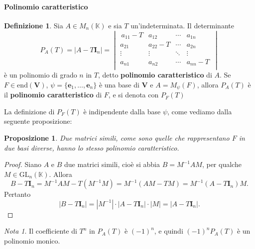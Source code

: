 \documentclass{article}
\theoremstyle{plain}
\newtheorem{prop}[thm]{Proposizione}
\theoremstyle{definition}
\newtheorem{defn}{Definizione}[section]
\theoremstyle{remark}
\newtheorem{note}{Nota}
\begin{document}
\paragraph{Polinomio caratteristico}
\begin{bxthm}
\begin{defn}
Sia $A \in M_n(\mathbb{K})$ e sia $T$ un'indeterminata. Il determinante
\[
P_A(T) = \lvert A - T \mathbf{I}_n \rvert =
\begin{vmatrix}
\,a_{11} - T & a_{12} & \cdots & a_{1n} \\
a_{21} & a_{22} - T & \cdots & a_{2n} \\
\vdots & \vdots & \ddots & \vdots \\
a_{n1} & a_{n2} & \cdots & a_{nn} - T \,\\
\end{vmatrix}
\]
è un polinomio di grado $n$ in $T$, detto \textbf{polinomio caratteristico} di $A$.    
Se $F\in\mathrm{end}(\mathbf{V})$, $\psi=\{\mathbf{e}_1,\ldots,\mathbf{e}_n\}$ è una base di $\mathbf{V}$ 
e $A=M_\psi(F)$, allora $P_A(T)$ è il \textbf{polinomio caratteristico} di $F$, e si denota con $P_F(T)$
\end{defn}
\end{bxthm}

\vspace{10pt}

La definizione di $P_F(T)$ è indipendente dalla base $\psi$, come vediamo dalla seguente proposizione:

\vspace{10pt}

\begin{bxthm}
\begin{prop}
    Due matrici simili, come sono quelle che rappresentano $F$ in due basi diverse, hanno lo stesso polinomio caratteristico.
\end{prop}
\end{bxthm}
\begin{proof}
Siano $A$ e $B$ due matrici simili, cioè si abbia $B = M^{-1}AM$, per qualche $M \in \mathrm{GL}_n(\mathbb{K})$. 
Allora
\[B-T\mathbf{I}_n=M^{-1}AM-T(M^{-1}M)=M^{-1}(AM-TM)=M^{-1}(A-T\mathbf{I}_n)M.\]
Pertanto 
\[|B - T\mathbf{I}_n| = |M^{-1}| \cdot |A - T\mathbf{I}_n| \cdot |M| = |A - T\mathbf{I}_n|.\]
\end{proof}

\vspace{10pt}

\begin{note}
Il coefficiente di $T^n$ in $P_A(T)$ è $(-1)^n$, e quindi $(-1)^n P_A(T)$ è un polinomio monico.    
\end{note}
\end{document}
